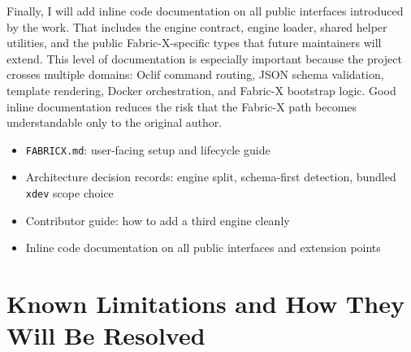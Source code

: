 Finally, I will add inline code documentation on all public interfaces introduced by the work. That includes the engine contract, engine loader, shared helper utilities, and the public Fabric-X-specific types that future maintainers will extend. This level of documentation is especially important because the project crosses multiple domains: Oclif command routing, JSON schema validation, template rendering, Docker orchestration, and Fabric-X bootstrap logic. Good inline documentation reduces the risk that the Fabric-X path becomes understandable only to the original author.

\begin{tcolorbox}[colback=gray!5!white, colframe=gray!50!black,
  title=Documentation deliverables,
  fonttitle=\bfseries, arc=4pt]
\begin{itemize}[leftmargin=*]
  \item \texttt{FABRICX.md}: user-facing setup and lifecycle guide
  \item Architecture decision records: engine split, schema-first detection, bundled \texttt{xdev} scope choice
  \item Contributor guide: how to add a third engine cleanly
  \item Inline code documentation on all public interfaces and extension points
\end{itemize}
\end{tcolorbox}

\section{Known Limitations and How They Will Be Resolved}

